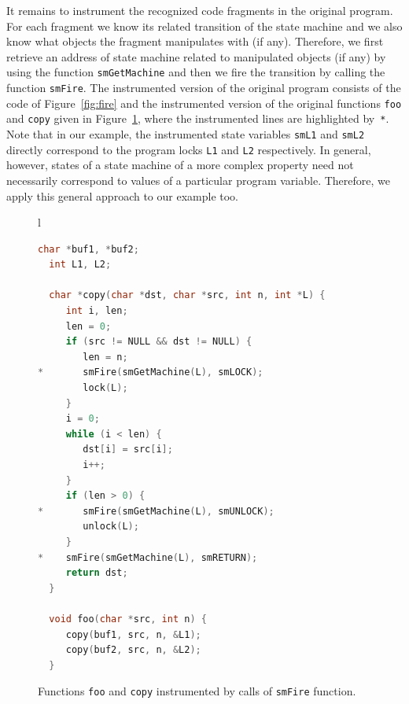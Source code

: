 \documentclass[10pt]{llncs}
\newcommand\Color[2]{\textcolor{#1}{#2}}
\newcommand{\todol}[1]{{\scriptsize{{\textcolor{red}{[#1]}}}}}
\newcommand\bluetext[1]{{\Color{blue}{#1}}}
\renewcommand\bluetext[1]{#1}
\begin{document}
It remains to instrument the recognized code fragments in the original
program. For each fragment we know its related transition of the state
machine and we also know what objects the fragment manipulates with (if
any). Therefore, we first retrieve an address of state machine related to
manipulated objects (if any) by using the function \texttt{smGetMachine} and
then we fire the transition by calling the function \texttt{smFire}. The
instrumented version of the original program consists of the code of
Figure~\ref{fig:fire} and the instrumented version of the original functions
\texttt{foo} and \texttt{copy} given in Figure~\ref{fig:copy_instrumented},
where the instrumented lines are highlighted by~\texttt{*}.
\bluetext{Note that in our example, the instrumented state variables
\texttt{smL1} and \texttt{smL2} directly correspond to the program locks
\texttt{L1} and \texttt{L2} respectively. In general, however, states of a
state machine of a more complex property need not necessarily correspond to
values of a particular program variable. Therefore, we apply this general
approach to our example too.}

\begin{figure}[tb]
    \begin{center}
    \begin{tabular}{l}
    \begin{lstlisting}[language=C]
  char *buf1, *buf2;
  int L1, L2;

  char *copy(char *dst, char *src, int n, int *L) {
     int i, len;
     len = 0;
     if (src != NULL && dst != NULL) {
        len = n;
*       smFire(smGetMachine(L), smLOCK);
        lock(L);
     }
     i = 0;
     while (i < len) {
        dst[i] = src[i];
        i++;
     }
     if (len > 0) {
*       smFire(smGetMachine(L), smUNLOCK);
        unlock(L);
     }
*    smFire(smGetMachine(L), smRETURN);
     return dst;
  }

  void foo(char *src, int n) {
     copy(buf1, src, n, &L1);
     copy(buf2, src, n, &L2);
  }
    \end{lstlisting}
    \end{tabular}
    \end{center}
    \caption{Functions \texttt{foo} and \texttt{copy} instrumented by calls
      of \texttt{smFire} function.}
    \label{fig:copy_instrumented}
\end{figure}

\end{document}
